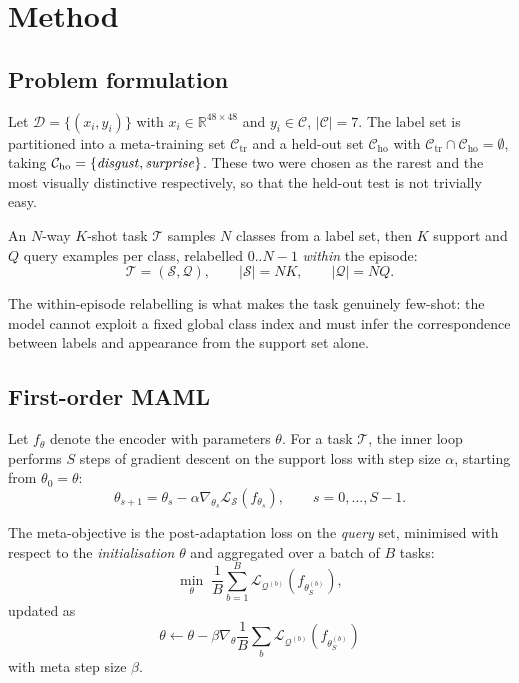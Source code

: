 \documentclass[11pt,a4paper]{article}
\begin{document}
\section{Method}
\label{sec:method}

\subsection{Problem formulation}
Let $\mathcal{D} = \{(x_i, y_i)\}$ with $x_i \in \mathbb{R}^{48\times48}$ and
$y_i \in \mathcal{C}$, $|\mathcal{C}| = 7$. The label set is partitioned into a
meta-training set $\mathcal{C}_{\text{tr}}$ and a held-out set
$\mathcal{C}_{\text{ho}}$ with
$\mathcal{C}_{\text{tr}} \cap \mathcal{C}_{\text{ho}} = \emptyset$, taking
$\mathcal{C}_{\text{ho}} = \{\text{\emph{disgust}}, \text{\emph{surprise}}\}$.
These two were chosen as the rarest and the most visually distinctive
respectively, so that the held-out test is not trivially easy.

An $N$-way $K$-shot task $\mathcal{T}$ samples $N$ classes from a label set,
then $K$ support and $Q$ query examples per class, relabelled $0..N{-}1$
\emph{within} the episode:
\begin{equation}
\mathcal{T} = \left( \mathcal{S}, \mathcal{Q} \right), \qquad
|\mathcal{S}| = NK, \qquad |\mathcal{Q}| = NQ .
\end{equation}

The within-episode relabelling is what makes the task genuinely few-shot: the
model cannot exploit a fixed global class index and must infer the
correspondence between labels and appearance from the support set alone.

\subsection{First-order MAML}
\label{sec:maml}
Let $f_\theta$ denote the encoder with parameters $\theta$. For a task
$\mathcal{T}$, the inner loop performs $S$ steps of gradient descent on the
support loss with step size $\alpha$, starting from $\theta_0 = \theta$:
\begin{equation}
\theta_{s+1} = \theta_{s} - \alpha \nabla_{\theta_{s}}
  \mathcal{L}_{\mathcal{S}}\!\left( f_{\theta_{s}} \right),
\qquad s = 0,\dots,S-1 .
\label{eq:inner}
\end{equation}

The meta-objective is the post-adaptation loss on the \emph{query} set,
minimised with respect to the \emph{initialisation} $\theta$ and aggregated
over a batch of $B$ tasks:
\begin{equation}
\min_{\theta} \; \frac{1}{B} \sum_{b=1}^{B}
  \mathcal{L}_{\mathcal{Q}^{(b)}}\!\left( f_{\theta_S^{(b)}} \right),
\label{eq:outer}
\end{equation}
updated as
\begin{equation}
\theta \leftarrow \theta - \beta \nabla_\theta \frac{1}{B}\sum_b
\mathcal{L}_{\mathcal{Q}^{(b)}}\!\left(f_{\theta_S^{(b)}}\right)
\end{equation}
with meta step size $\beta$.
\end{document}
